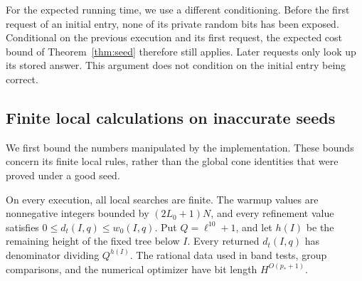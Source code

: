 For the expected running time, we use a different conditioning.
Before the first request of an initial entry, none of its private random bits has
been exposed.  Conditional on the previous execution and its first
request, the expected cost bound of Theorem~\ref{thm:seed} therefore
still applies.  Later requests only look up its stored answer.  This
argument does not condition on the initial entry being correct.

\subsection{Finite local calculations on inaccurate seeds}

We first bound the numbers manipulated by the implementation.  These
bounds concern its finite local rules, rather than the global cone
identities that were proved under a good seed.

\begin{lemma}
\label{lem:unconditional-sizes}
On every execution, all local searches are finite.  The warmup values
are nonnegative integers bounded by $(2L_0+1)N$, and every refinement
value satisfies $0\le d_t(I,q)\le w_0(I,q)$.  Put
$Q=\ell^{10}+1$, and let $h(I)$ be the remaining height of the fixed
tree below $I$.  Every returned $d_t(I,q)$ has denominator dividing
$Q^{h(I)}$.  The rational data used in band tests, group comparisons,
and the numerical optimizer have bit length $H^{O(p_*+1)}$.
\end{lemma}

